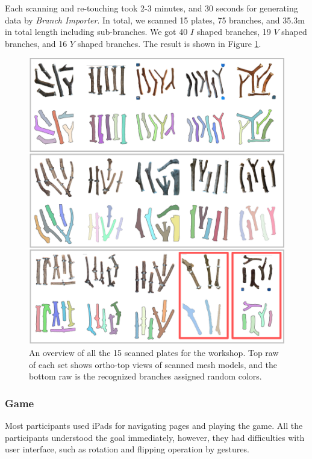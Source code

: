 Each scanning and re-touching took 2-3 minutes, and 30 seconds for generating data by \textit{Branch Importer}.
In total, we scanned 15 plates, 75 branches, and 35.3m in total length including sub-branches. 
We got 40 $I$ shaped branches, 19 $V$ shaped branches, and 16 $Y$ shaped branches.
The result is shown in Figure \ref{fig:scannedplates}.

\begin{figure}[ht]
  \begin{center}
    \includegraphics[width = 0.4\paperwidth]{images/fabrication/all_plates.png}
    \caption{An overview of all the 15 scanned plates for the workshop. Top raw of each set shows ortho-top views of scanned mesh models, and the bottom raw is the recognized branches assigned random colors.}
    \label{fig:scannedplates}
  \end{center}
\end{figure}


\subsubsection*{Game}
Most participants used iPads for navigating pages and playing the game.
All the participants understood the goal immediately, however, they had difficulties with user interface, such as rotation and flipping operation by gestures.

